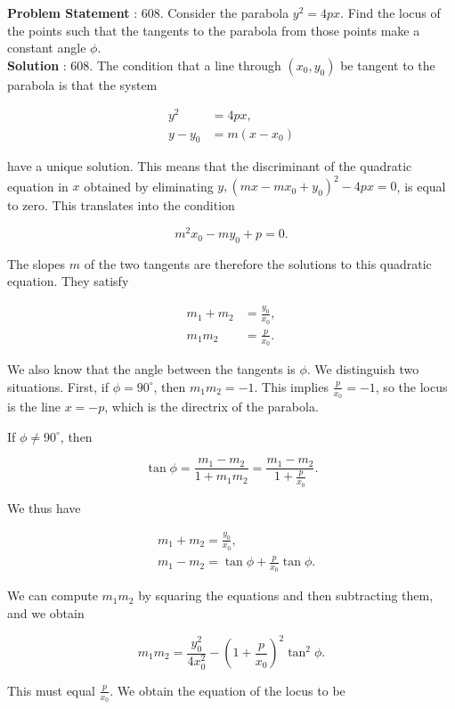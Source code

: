 \documentclass[10pt]{article}
\begin{document}
\textbf{Problem Statement} :
608. Consider the parabola $y^{2}=4 p x$. Find the locus of the points such that the tangents to the parabola from those points make a constant angle $\phi$.
\\
\textbf{Solution} :
608. The condition that a line through $\left(x_{0}, y_{0}\right)$ be tangent to the parabola is that the system

$$
\begin{aligned}
y^{2} &=4 p x, \\
y-y_{0} &=m\left(x-x_{0}\right)
\end{aligned}
$$

have a unique solution. This means that the discriminant of the quadratic equation in $x$ obtained by eliminating $y,\left(m x-m x_{0}+y_{0}\right)^{2}-4 p x=0$, is equal to zero. This translates into the condition

$$
m^{2} x_{0}-m y_{0}+p=0 .
$$

The slopes $m$ of the two tangents are therefore the solutions to this quadratic equation. They satisfy 

$$
\begin{aligned}
m_{1}+m_{2} &=\frac{y_{0}}{x_{0}}, \\
m_{1} m_{2} &=\frac{p}{x_{0}} .
\end{aligned}
$$

We also know that the angle between the tangents is $\phi$. We distinguish two situations. First, if $\phi=90^{\circ}$, then $m_{1} m_{2}=-1$. This implies $\frac{p}{x_{0}}=-1$, so the locus is the line $x=-p$, which is the directrix of the parabola.

If $\phi \neq 90^{\circ}$, then

$$
\tan \phi=\frac{m_{1}-m_{2}}{1+m_{1} m_{2}}=\frac{m_{1}-m_{2}}{1+\frac{p}{x_{0}}} .
$$

We thus have

$$
\begin{aligned}
&m_{1}+m_{2}=\frac{y_{0}}{x_{0}}, \\
&m_{1}-m_{2}=\tan \phi+\frac{p}{x_{0}} \tan \phi .
\end{aligned}
$$

We can compute $m_{1} m_{2}$ by squaring the equations and then subtracting them, and we obtain

$$
m_{1} m_{2}=\frac{y_{0}^{2}}{4 x_{0}^{2}}-\left(1+\frac{p}{x_{0}}\right)^{2} \tan ^{2} \phi .
$$

This must equal $\frac{p}{x_{0}}$. We obtain the equation of the locus to be
\end{document}

